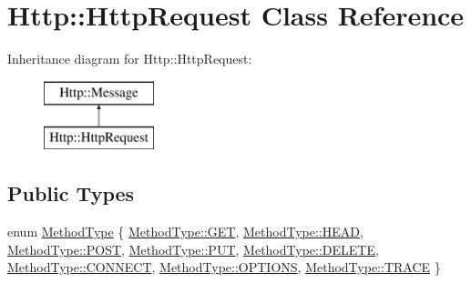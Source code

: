 \hypertarget{classHttp_1_1HttpRequest}{}\section{Http\+::Http\+Request Class Reference}
\label{classHttp_1_1HttpRequest}
Inheritance diagram for Http\+::Http\+Request\+:\begin{figure}[H]
\begin{center}
\leavevmode
\includegraphics[height=2.000000cm]{classHttp_1_1HttpRequest}
\end{center}
\end{figure}
\subsection*{Public Types}
\begin{DoxyCompactItemize}
\item 
enum \mbox{\hyperlink{classHttp_1_1HttpRequest_a81e0eff01101e40ca91a87b25f4ce6a9}{Method\+Type}} \{ \newline
\mbox{\hyperlink{classHttp_1_1HttpRequest_a81e0eff01101e40ca91a87b25f4ce6a9a7528035a93ee69cedb1dbddb2f0bfcc8}{Method\+Type\+::\+G\+ET}}, 
\mbox{\hyperlink{classHttp_1_1HttpRequest_a81e0eff01101e40ca91a87b25f4ce6a9ae15e216fc1c639f787b1231ecdfa1bf8}{Method\+Type\+::\+H\+E\+AD}}, 
\mbox{\hyperlink{classHttp_1_1HttpRequest_a81e0eff01101e40ca91a87b25f4ce6a9aa02439ec229d8be0e74b0c1602392310}{Method\+Type\+::\+P\+O\+ST}}, 
\mbox{\hyperlink{classHttp_1_1HttpRequest_a81e0eff01101e40ca91a87b25f4ce6a9a3e75383a5992a6d15fb81e872e46e256}{Method\+Type\+::\+P\+UT}}, 
\newline
\mbox{\hyperlink{classHttp_1_1HttpRequest_a81e0eff01101e40ca91a87b25f4ce6a9a32f68a60cef40faedbc6af20298c1a1e}{Method\+Type\+::\+D\+E\+L\+E\+TE}}, 
\mbox{\hyperlink{classHttp_1_1HttpRequest_a81e0eff01101e40ca91a87b25f4ce6a9ab57e2519e26151feacdbe52076bc39ec}{Method\+Type\+::\+C\+O\+N\+N\+E\+CT}}, 
\mbox{\hyperlink{classHttp_1_1HttpRequest_a81e0eff01101e40ca91a87b25f4ce6a9a164dd62adb30ca051b5289672a572f9b}{Method\+Type\+::\+O\+P\+T\+I\+O\+NS}}, 
\mbox{\hyperlink{classHttp_1_1HttpRequest_a81e0eff01101e40ca91a87b25f4ce6a9a2d3e4144aa384b18849ab9a8abad74d6}{Method\+Type\+::\+T\+R\+A\+CE}}
 \}
\end{DoxyCompactItemize}
